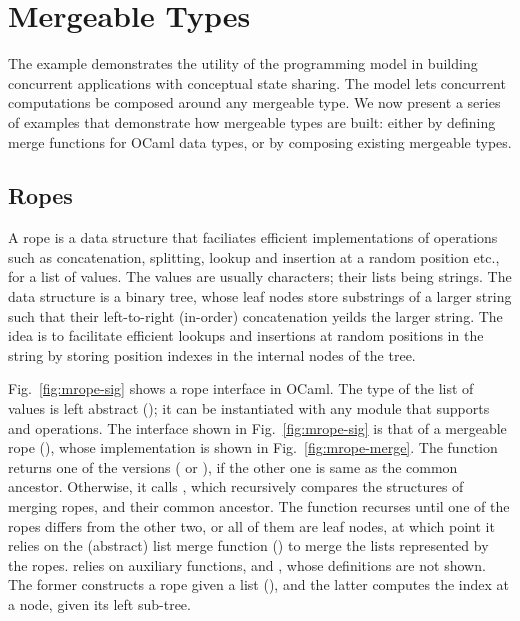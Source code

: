 \section{Mergeable Types}



The \drawsome example demonstrates the utility of the \name
programming model in building concurrent applications with conceptual
state sharing. The model lets concurrent computations be composed
around any mergeable type. We now present a series of examples that
demonstrate how mergeable types are built: either by defining merge
functions for OCaml data types, or by composing existing mergeable
types.

\subsection{Ropes}

A rope is a data structure that faciliates efficient
implementations of operations such as concatenation, splitting, lookup
and insertion at a random position etc., for a list of values. The
values are usually characters; their lists being strings. The data
structure is a binary tree, whose leaf nodes store substrings of a
larger string such that their left-to-right (in-order) concatenation
yeilds the larger string. The idea is to facilitate efficient lookups
and insertions at random positions in the string by storing
position indexes in the internal nodes of the tree. 

Fig.~\ref{fig:mrope-sig} shows a rope interface in OCaml. The type of
the list of values is left abstract (); it can be instantiated
with any module that supports  and  operations. The
interface shown in Fig.~\ref{fig:mrope-sig} is that of a mergeable
rope (), whose  implementation is shown
in Fig.~\ref{fig:mrope-merge}. The function returns one of the
versions ( or ), if the other one is same as the common
ancestor. Otherwise, it calls , which recursively
compares the structures of merging ropes, and their common ancestor.
The function recurses until one of the ropes differs from the other
two, or all of them are leaf nodes, at which point it relies on the
(abstract) list merge function () to merge the lists
represented by the ropes.  relies on auxiliary
functions,  and , whose definitions are
not shown. The former constructs a rope given a list (), and
the latter computes the index at a node, given its left sub-tree.

